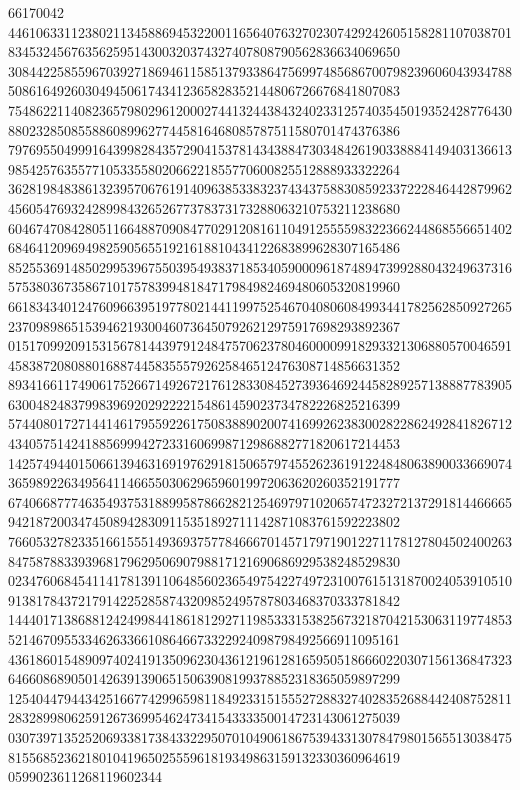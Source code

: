 \documentclass[10pt,
b5paper,
fleqn,
dvipdfmx,
uplatex
]{jsarticle}
\begin{document}
66170042\\44610633112380211345886945322001165640763270230742924260515828110703870183453245676356259514300320374327407808790562836634069650\\30844225855967039271869461158513793386475699748568670079823960604393478850861649260304945061743412365828352144806726676841807083\\75486221140823657980296120002744132443843240233125740354501935242877643088023285085588608996277445816468085787511580701474376386\\79769550499916439982843572904153781434388473034842619033888414940313661398542576355771053355802066221855770600825512888933322264\\36281984838613239570676191409638533832374343758830859233722284644287996245605476932428998432652677378373173288063210753211238680\\60467470842805116648870908477029120816110491255559832236624486855665140268464120969498259056551921618810434122683899628307165486\\85255369148502995396755039549383718534059000961874894739928804324963731657538036735867101757839948184717984982469480605320819960\\66183434012476096639519778021441199752546704080608499344178256285092726523709898651539462193004607364507926212975917698293892367\\01517099209153156781443979124847570623780460000991829332130688057004659145838720808801688744583555792625846512476308714856631352\\89341661174906175266714926721761283308452739364692445828925713888778390563004824837998396920292222154861459023734782226825216399\\57440801727144146179559226175083889020074169926238300282286249284182671243405751424188569994272331606998712986882771820617214453\\14257494401506613946316919762918150657974552623619122484806389003366907436598922634956411466550306296596019972063620260352191777\\67406687774635493753188995878662821254697971020657472327213729181446666594218720034745089428309115351892711142871083761592223802\\76605327823351661555149369375778466670145717971901227117812780450240026384758788339396817962950690798817121690686929538248529830\\02347606845411417813911064856023654975422749723100761513187002405391051091381784372179142252858743209852495787803468370333781842\\14440171386881242499844186181292711985333153825673218704215306311977485352146709553346263366108646673322924098798492566911095161\\43618601548909740241913509623043612196128165950518666022030715613684732364660868905014263913906515063908199378852318365059897299\\12540447944342516677429965981184923315155527288327402835268844240875281128328998062591267369954624734154333350014723143061275039\\03073971352520693381738433229507010490618675394331307847980156551303847581556852362180104196502555961819349863159132330360964619\\0599023611268119602344
\end{document}
